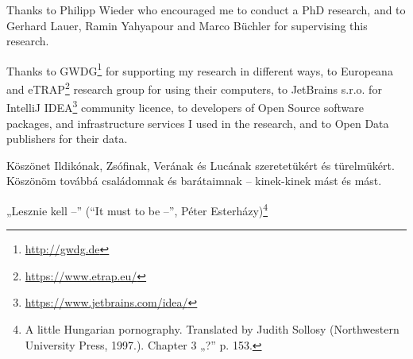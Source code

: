 Thanks to Philipp Wieder who encouraged me to conduct a PhD research, and to Gerhard Lauer, Ramin Yahyapour and Marco Büchler for supervising this research.

Thanks to GWDG\footnote{\url{http://gwdg.de}} for supporting my research in different ways, to Europeana and eTRAP\footnote{\url{https://www.etrap.eu/}} research group for using their computers, to JetBrains s.r.o. for IntelliJ IDEA\footnote{\url{https://www.jetbrains.com/idea/}} community licence, to developers of Open Source software packages, and infrastructure services I used in the research, and to Open Data publishers for their data.

\begin{otherlanguage}{magyar}
Köszönet Ildikónak, Zsófinak, Verának és Lucának szeretetükért és türel\-mükért. Köszönöm továbbá családomnak és barátaimnak -- kinek-kinek mást és mást.
\end{otherlanguage}

„Lesznie kell --” (``It must to be --'', Péter Esterházy)\footnote{A little Hungarian pornography. Translated by Judith Sollosy (Northwestern University Press, 1997.). Chapter 3 „?” p. 153.}